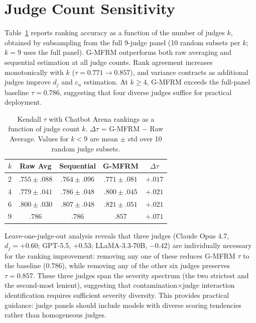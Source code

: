 \section{Judge Count Sensitivity}
\label{app:judge_count}

Table~\ref{tab:judge_count} reports ranking accuracy as a function of the number of judges $k$, obtained by subsampling from the full 9-judge panel (10 random subsets per $k$; $k = 9$ uses the full panel). G-MFRM outperforms both raw averaging and sequential estimation at all judge counts. Rank agreement increases monotonically with $k$ ($\tau = 0.771 \to 0.857$), and variance contracts as additional judges improve $d_j$ and $c_n$ estimation. At $k \geq 4$, G-MFRM exceeds the full-panel baseline $\tau = 0.786$, suggesting that four diverse judges suffice for practical deployment.

\begin{table}[h]
\centering
\small
\begin{tabular}{lcccc}
\toprule
$k$ & Raw Avg & Sequential & G-MFRM & $\Delta\tau$ \\
\midrule
2 & $.755 \pm .088$ & $.764 \pm .096$ & $.771 \pm .081$ & $+.017$ \\
4 & $.779 \pm .041$ & $.786 \pm .048$ & $.800 \pm .045$ & $+.021$ \\
6 & $.800 \pm .030$ & $.807 \pm .048$ & $.821 \pm .051$ & $+.021$ \\
9 & $.786$ & $.786$ & $.857$ & $+.071$ \\
\bottomrule
\end{tabular}
\caption{Kendall $\tau$ with Chatbot Arena rankings as a function of judge count $k$. $\Delta\tau$ = G-MFRM $-$ Raw Average. Values for $k < 9$ are mean $\pm$ std over 10 random judge subsets.}
\label{tab:judge_count}
\end{table}

Leave-one-judge-out analysis reveals that three judges (Claude Opus 4.7, $d_j = +0.60$; GPT-5.5, $+0.53$; LLaMA-3.3-70B, $-0.42$) are individually necessary for the ranking improvement: removing any one of these reduces G-MFRM $\tau$ to the baseline ($0.786$), while removing any of the other six judges preserves $\tau = 0.857$. These three judges span the severity spectrum (the two strictest and the second-most lenient), suggesting that contamination$\times$judge interaction identification requires sufficient severity diversity. This provides practical guidance: judge panels should include models with diverse scoring tendencies rather than homogeneous judges.

